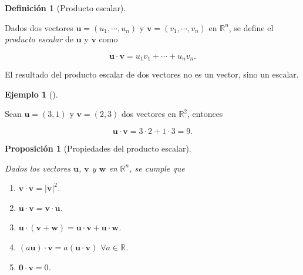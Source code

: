 \documentclass[
  a4paper,
]{scrreport}
\providecommand{\tightlist}{%
  \setlength{\itemsep}{0pt}\setlength{\parskip}{0pt}}\usepackage{longtable,booktabs,array}
\theoremstyle{definition}
\newtheorem{example}{Ejemplo}[chapter]
\theoremstyle{plain}
\theoremstyle{definition}
\newtheorem{definition}{Definición}[chapter]
\theoremstyle{definition}
\theoremstyle{plain}
\theoremstyle{plain}
\newtheorem{proposition}{Proposición}[chapter]
\theoremstyle{remark}
\begin{document}
\begin{definition}[Producto
escalar]\protect\hypertarget{def-producto-escalar}{}\label{def-producto-escalar}

Dados dos vectores \(\mathbf{u}=(u_1,\cdots,u_n)\) y
\(\mathbf{v}=(v_1,\cdots,v_n)\) en \(\mathbb{R}^n\), se define el
\emph{producto escalar} de \(\mathbf{u}\) y \(\mathbf{v}\) como

\[
\mathbf{u}\cdot \mathbf{v} = u_1v_1 + \cdots + u_nv_n.
\]

\end{definition}

\begin{tcolorbox}[enhanced jigsaw, leftrule=.75mm, colbacktitle=quarto-callout-warning-color!10!white, toprule=.15mm, opacityback=0, opacitybacktitle=0.6, toptitle=1mm, breakable, bottomtitle=1mm, colframe=quarto-callout-warning-color-frame, rightrule=.15mm, titlerule=0mm, title=\textcolor{quarto-callout-warning-color}{\faExclamationTriangle}\hspace{0.5em}{Advertencia}, arc=.35mm, left=2mm, bottomrule=.15mm, colback=white, coltitle=black]

El resultado del producto escalar de dos vectores no es un vector, sino
un escalar.

\end{tcolorbox}

\begin{example}[]\protect\hypertarget{exm-producto-escalar}{}\label{exm-producto-escalar}

Sean \(\mathbf{u}=(3,1)\) y \(\mathbf{v}=(2,3)\) dos vectores en
\(\mathbb{R}^2\), entonces

\[
\mathbf{u}\cdot\mathbf{v} = 3\cdot 2 +1\cdot 3 = 9.
\]

\end{example}

\begin{proposition}[Propiedades del producto
escalar]\protect\hypertarget{prp-propiedades-producto-escalar}{}\label{prp-propiedades-producto-escalar}

Dados los vectores \(\mathbf{u}\), \(\mathbf{v}\) y \(\mathbf{w}\) en
\(\mathbb{R}^n\), se cumple que

\begin{enumerate}
\def\labelenumi{\alph{enumi}.}
\tightlist
\item
  \(\mathbf{v}\cdot\mathbf{v} = |\mathbf{v}|^2\).
\item
  \(\mathbf{u}\cdot\mathbf{v} = \mathbf{v}\cdot\mathbf{u}\).
\item
  \(\mathbf{u}\cdot(\mathbf{v}+\mathbf{w}) = \mathbf{u}\cdot\mathbf{v} + \mathbf{u}\cdot\mathbf{w}\).
\item
  \((a\mathbf{u})\cdot\mathbf{v} = a(\mathbf{u}\cdot\mathbf{v})\)
  \(\forall a\in\mathbb{R}\).
\item
  \(\mathbf{0} \cdot \mathbf{v} = 0\).
\end{enumerate}

\end{proposition}
\end{document}
